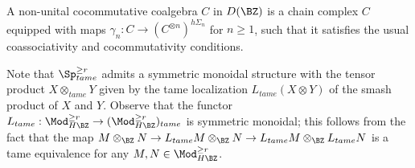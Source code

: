 A non-unital cocommutative coalgebra $C$ in $D(\BZ)$ is a chain complex $C$ equipped with maps $\gamma_n: C \to (C^{\otimes n})^{h\Sigma_n}$ for $n\geq 1$, such that it satisfies the usual coassociativity and cocommutativity conditions. 

\begin{remark}
	Note that $\Sp^{\geq r}_{tame}$ admits a symmetric monoidal structure with the tensor product $X\otimes_{tame} Y$ given by the tame localization $L_{tame}(X\otimes Y)$ of the smash product of $X$ and $Y$. Observe that the functor $L_{tame}:\Mod_{H\BZ}^{\geq r}\to (\Mod_{H\BZ}^{\geq r})_{tame}$ is symmetric monoidal; this follows from the fact that the map $M \otimes_{\BZ} N \to L_{tame}M\otimes_{\BZ} N \to L_{tame}M\otimes_{\BZ} L_{tame}N$ is a tame equivalence for any $M,N\in \Mod_{H\BZ}^{\geq r}$.
\end{remark}


%






